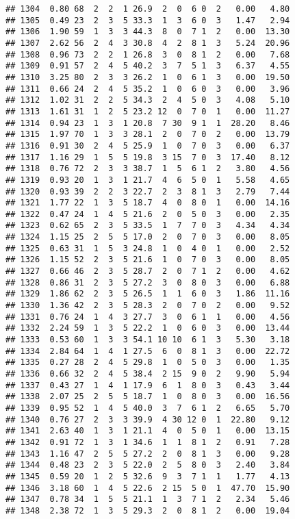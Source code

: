 \documentclass[
]{article}
\begin{document}
\begin{verbatim}
## 1304  0.80 68  2  2  1 26.9  2  0  6 0  2   0.00   4.80
## 1305  0.49 23  2  3  5 33.3  1  3  6 0  3   1.47   2.94
## 1306  1.90 59  1  3  3 44.3  8  0  7 1  2   0.00  13.30
## 1307  2.62 56  2  4  3 30.8  4  2  8 1  3   5.24  20.96
## 1308  0.96 73  2  2  1 26.8  3  0  8 1  2   0.00   7.68
## 1309  0.91 57  2  4  5 40.2  3  7  5 1  3   6.37   4.55
## 1310  3.25 80  2  3  3 26.2  1  0  6 1  3   0.00  19.50
## 1311  0.66 24  2  4  5 35.2  1  0  6 0  3   0.00   3.96
## 1312  1.02 31  2  2  5 34.3  2  4  5 0  3   4.08   5.10
## 1313  1.61 31  1  2  5 23.2 12  0  7 0  1   0.00  11.27
## 1314  0.94 23  1  3  1 20.8  7 30  9 1  1  28.20   8.46
## 1315  1.97 70  1  3  3 28.1  2  0  7 0  2   0.00  13.79
## 1316  0.91 30  2  4  5 25.9  1  0  7 0  3   0.00   6.37
## 1317  1.16 29  1  5  5 19.8  3 15  7 0  3  17.40   8.12
## 1318  0.76 72  2  3  3 38.7  1  5  6 1  2   3.80   4.56
## 1319  0.93 20  1  3  1 21.7  4  6  5 0  1   5.58   4.65
## 1320  0.93 39  2  2  3 22.7  2  3  8 1  3   2.79   7.44
## 1321  1.77 22  1  3  5 18.7  4  0  8 0  1   0.00  14.16
## 1322  0.47 24  1  4  5 21.6  2  0  5 0  3   0.00   2.35
## 1323  0.62 65  2  3  5 33.5  1  7  7 0  3   4.34   4.34
## 1324  1.15 25  2  5  5 17.0  2  0  7 0  3   0.00   8.05
## 1325  0.63 31  1  5  3 24.8  1  0  4 0  1   0.00   2.52
## 1326  1.15 52  2  3  5 21.6  1  0  7 0  3   0.00   8.05
## 1327  0.66 46  2  3  5 28.7  2  0  7 1  2   0.00   4.62
## 1328  0.86 31  2  3  5 27.2  3  0  8 0  3   0.00   6.88
## 1329  1.86 62  2  3  5 26.5  1  1  6 0  3   1.86  11.16
## 1330  1.36 42  2  3  5 28.3  2  0  7 0  2   0.00   9.52
## 1331  0.76 24  1  4  3 27.7  3  0  6 1  1   0.00   4.56
## 1332  2.24 59  1  3  5 22.2  1  0  6 0  3   0.00  13.44
## 1333  0.53 60  1  3  3 54.1 10 10  6 1  3   5.30   3.18
## 1334  2.84 64  1  4  1 27.5  6  0  8 1  3   0.00  22.72
## 1335  0.27 28  2  4  5 29.8  1  0  5 0  3   0.00   1.35
## 1336  0.66 32  2  4  5 38.4  2 15  9 0  2   9.90   5.94
## 1337  0.43 27  1  4  1 17.9  6  1  8 0  3   0.43   3.44
## 1338  2.07 25  2  5  5 18.7  1  0  8 0  3   0.00  16.56
## 1339  0.95 52  1  4  5 40.0  3  7  6 1  2   6.65   5.70
## 1340  0.76 27  2  3  3 39.9  4 30 12 0  1  22.80   9.12
## 1341  2.63 40  1  3  1 21.1  4  0  5 0  1   0.00  13.15
## 1342  0.91 72  1  3  1 34.6  1  1  8 1  2   0.91   7.28
## 1343  1.16 47  2  5  5 27.2  2  0  8 1  3   0.00   9.28
## 1344  0.48 23  2  3  5 22.0  2  5  8 0  3   2.40   3.84
## 1345  0.59 20  1  2  5 32.6  9  3  7 1  1   1.77   4.13
## 1346  3.18 60  1  4  5 22.6  2 15  5 0  1  47.70  15.90
## 1347  0.78 34  1  5  5 21.1  1  3  7 1  2   2.34   5.46
## 1348  2.38 72  1  3  5 29.3  2  0  8 1  2   0.00  19.04

\end{verbatim}
\end{document}
